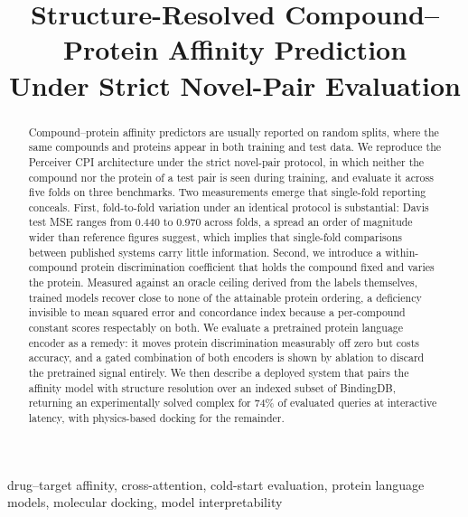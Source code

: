 \documentclass[conference]{IEEEtran}
\begin{document}
\title{Structure-Resolved Compound--Protein Affinity Prediction\\
Under Strict Novel-Pair Evaluation}

\author{
}

\maketitle

\begin{abstract}
Compound--protein affinity predictors are usually reported on random splits, where the same
compounds and proteins appear in both training and test data. We reproduce the Perceiver CPI
architecture under the strict novel-pair protocol, in which neither the compound nor the protein of
a test pair is seen during training, and evaluate it across five folds on three benchmarks. Two
measurements emerge that single-fold reporting conceals. First, fold-to-fold variation under an
identical protocol is substantial: Davis test MSE ranges from 0.440 to 0.970 across folds, a spread
an order of magnitude wider than reference figures suggest, which implies that single-fold
comparisons between published systems carry little information. Second, we introduce a
within-compound protein discrimination coefficient that holds the compound fixed and varies the
protein. Measured against an oracle ceiling derived from the labels themselves, trained models
recover close to none of the attainable protein ordering, a deficiency invisible to mean squared
error and concordance index because a per-compound constant scores respectably on both. We evaluate
a pretrained protein language encoder as a remedy: it moves protein discrimination measurably off
zero but costs accuracy, and a gated combination of both encoders is shown by ablation to discard
the pretrained signal entirely. We then describe a deployed system that pairs the affinity model
with structure resolution over an indexed subset of BindingDB, returning an experimentally solved
complex for 74\% of evaluated queries at interactive latency, with physics-based docking for the
remainder.
\end{abstract}

\begin{IEEEkeywords}
drug--target affinity, cross-attention, cold-start evaluation, protein language models, molecular
docking, model interpretability
\end{IEEEkeywords}
\end{document}
